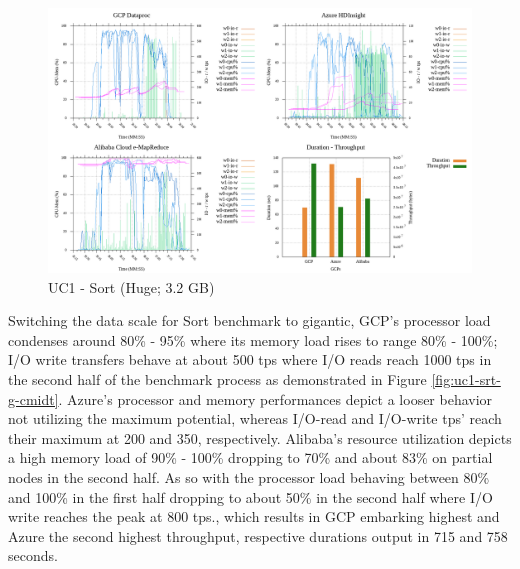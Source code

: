 \documentclass[review]{elsarticle}
\begin{document}
	\begin{figure}[p]
		\caption{UC1 - Sort (Huge; 3.2 GB)}
		\label{fig:uc1-srt-h-cmidt}
		\includegraphics[width=\textwidth]{uc1-srt-h-cmidt}
		\centering
	\end{figure}
	
	
	Switching the data scale for Sort benchmark to gigantic, GCP's processor load condenses around 80\% - 95\% where its memory load rises to range 80\% - 100\%; I/O write transfers behave at about 500 tps where I/O reads reach 1000 tps in the second half of the benchmark process as demonstrated in Figure \ref{fig:uc1-srt-g-cmidt}. Azure's processor and memory performances depict a looser behavior not utilizing the maximum potential, whereas I/O-read and I/O-write tps' reach their maximum at 200 and 350, respectively. Alibaba's resource utilization depicts a high memory load of 90\% - 100\% dropping to 70\% and about 83\% on partial nodes in the second half. As so with the processor load behaving between 80\% and 100\% in the first half dropping to about 50\% in the second half where I/O write reaches the peak at 800 tps., which results in GCP embarking highest and Azure the second highest throughput, respective durations output in 715 and 758 seconds.
	
\end{document}
